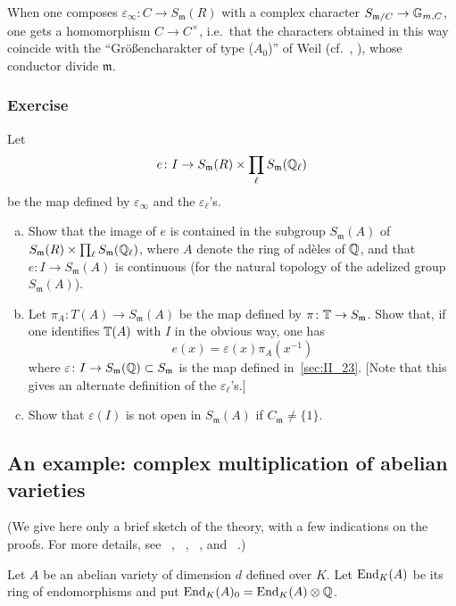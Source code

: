 When one composes $\varepsilon_\infty \colon C \to S_\mathfrak{m}(R)$ with a 
complex character $S_{\mathfrak{m}/C} \to \mathbb{G}_{m, C}$, one gets a 
homomorphism $C \to C^{\times}$, i.e.\ that the characters obtained in this way 
coincide with the ``Gr\"o\ss encharakter of type ($A_0$)'' of Weil (cf.\ 
\cite{35}, \cite{41}), whose conductor divide $\mathfrak{m}$.

\subsubsection*{Exercise}
Let 
\dpage
\[
	e \colon I \to S_\mathfrak{m}(R) \times \prod_{\ell} S_\mathfrak{m}(\mathbb{Q}_\ell)
\]
be the map defined by $\varepsilon_\infty$ and the $\varepsilon_\ell$'s.
\begin{enumerate}[a)]
\item Show that the image of $e$ is contained in the subgroup
	$S_\mathfrak{m}(A)$ of $S_\mathfrak{m}(R) \times \prod_{\ell}
	S_\mathfrak{m}(\mathbb{Q}_\ell)$, where $A$ denote the ring of adèles of $\mathbb{Q}$,
	and that $e \colon I \to S_\mathfrak{m}(A)$ is continuous (for the
	natural topology of the adelized group $S_\mathfrak{m}(A)$).
\item Let $\pi_A \colon T(A) \to S_\mathfrak{m}(A)$ be the map defined
	by $\pi \colon \mathbb{T} \to S_\mathfrak{m}$. Show that, if one
	identifies $\mathbb{T}(A)$ with $I$ in the obvious way, one has 
	\[
		e(x) = \varepsilon(x) \pi_A(x^{-1})
	\]
	where $\varepsilon \colon I \to S_\mathfrak{m}(\mathbb{Q}) \subset
	S_\mathfrak{m}$ is the map defined in~\ref{sec:II_23}. [Note that this
	gives an alternate definition of the $\varepsilon_\ell$'s.]
\item Show that $\varepsilon(I)$ is not open in $S_\mathfrak{m}(A)$ if
	$C_\mathfrak{m} \neq \{1\}$.
\end{enumerate}

\subsection{An example: complex multiplication of abelian varieties}
\label{sec:II_28}
(We give here only a brief sketch of the theory, with a few indications on the
proofs. For more details, see \citeauthor{34}~\cite{34},
\citeauthor{35}~\cite{35}, \citeauthor{41}~\cite{41}, \cite{42} and
\citeauthor{32}~\cite{32}.)

Let $A$ be an abelian variety of dimension $d$ defined over $K$.
Let $\operatorname{End}_K(A)$ be its ring of endomorphisms and put
$\operatorname{End}_K(A)_0 = \operatorname{End}_K(A) \otimes \mathbb{Q}$.


